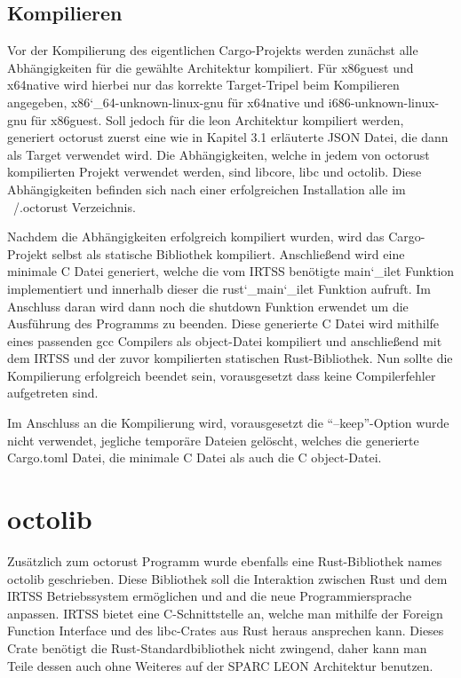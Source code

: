 \subsection{Kompilieren}

Vor der Kompilierung des eigentlichen Cargo-Projekts werden zunächst alle Abhängigkeiten für die gewählte Architektur kompiliert.
Für x86guest und x64native wird hierbei nur das korrekte Target-Tripel beim Kompilieren angegeben, x86\char`_64-unknown-linux-gnu für 
x64native und i686-unknown-linux-gnu für x86guest. Soll jedoch für die leon Architektur kompiliert werden, generiert octorust
zuerst eine wie in Kapitel 3.1 erläuterte JSON Datei, die dann als Target verwendet wird.
Die Abhängigkeiten, welche in jedem von octorust kompilierten Projekt verwendet werden, sind libcore, libc und octolib. Diese
Abhängigkeiten befinden sich nach einer erfolgreichen Installation alle im ~/.octorust Verzeichnis.

Nachdem die Abhängigkeiten erfolgreich kompiliert wurden, wird das Cargo-Projekt selbst als statische Bibliothek kompiliert.
Anschließend wird eine minimale C Datei generiert, welche die vom IRTSS benötigte main\char`_ilet Funktion implementiert und innerhalb
dieser die rust\char`_main\char`_ilet Funktion aufruft. Im Anschluss daran wird dann noch die shutdown Funktion erwendet um die 
Ausführung des Programms zu beenden. Diese generierte C Datei wird mithilfe eines passenden gcc Compilers als object-Datei kompiliert
und anschließend mit dem IRTSS und der zuvor kompilierten statischen Rust-Bibliothek. Nun sollte die Kompilierung erfolgreich beendet
sein, vorausgesetzt dass keine Compilerfehler aufgetreten sind.

Im Anschluss an die Kompilierung wird, vorausgesetzt die ``--keep''-Option wurde nicht verwendet, jegliche temporäre Dateien
gelöscht, welches die generierte Cargo.toml Datei, die minimale C Datei als auch die C object-Datei.

\section{octolib}

Zusätzlich zum octorust Programm wurde ebenfalls eine Rust-Bibliothek names octolib geschrieben. Diese Bibliothek soll
die Interaktion zwischen Rust und dem IRTSS Betriebssystem ermöglichen und and die neue Programmiersprache anpassen. IRTSS
bietet eine C-Schnittstelle an, welche man mithilfe der Foreign Function Interface und des libc-Crates aus Rust heraus ansprechen
kann. Dieses Crate benötigt die Rust-Standardbibliothek nicht zwingend, daher kann man Teile dessen auch ohne Weiteres auf der 
SPARC LEON Architektur benutzen.

